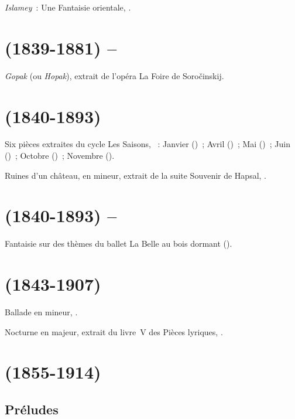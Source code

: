\emph{Islamey}~: Une Fantaisie orientale, .

\section[%
Modest Musorgskij (1839-1881) -- Sergej Rachmaninov]{%
\MMoussorgski{} (1839-1881) -- \SRachmaninov{}}

\emph{Gopak} (ou \emph{Hopak}), extrait de l'opéra La Foire de Soročinskij.

\section[%
Pëtr Čajkovskij (1840-1893)]{%
\PTchaikovski{} (1840-1893)}

Six pièces extraites du cycle Les Saisons, ~:  Janvier
()~;  Avril ()~;
 Mai ()~;  Juin
()~;  Octobre ()~;
 Novembre ().

Ruines d'un château, en \kE mineur, extrait de la suite Souvenir de Hapsal,
 .

\section[%
Pëtr Čajkovskij (1840-1893) -- Pavel Pabst]{%
\PTchaikovski{} (1840-1893) -- \PPabst{}}

Fantaisie sur des thèmes du ballet La Belle au bois dormant ().

\section[%
Edvard Grieg (1843-1907)]{%
\EGrieg{} (1843-1907)}

Ballade en \kG mineur, .

Nocturne en \kC majeur, extrait du livre~V des Pièces lyriques, 
.

\section[%
Anatolij Ljadov (1855-1914)]{%
\ALiadov{} (1855-1914)}

\subsection{Préludes}

